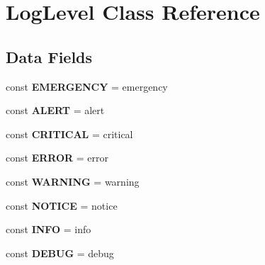 \hypertarget{class_zest_1_1_common_1_1_logger_1_1_log_level}{}\section{Log\+Level Class Reference}
\label{class_zest_1_1_common_1_1_logger_1_1_log_level}
\subsection*{Data Fields}
\begin{DoxyCompactItemize}
\item 
\mbox{\label{class_zest_1_1_common_1_1_logger_1_1_log_level_ad93131122361f85c70dab2636fe863a5}} 
const {\bfseries E\+M\+E\+R\+G\+E\+N\+CY} = \textquotesingle{}emergency\textquotesingle{}
\item 
\mbox{\label{class_zest_1_1_common_1_1_logger_1_1_log_level_a037a7f6e892e6adb07c2aa099fbaf69d}} 
const {\bfseries A\+L\+E\+RT} = \textquotesingle{}alert\textquotesingle{}
\item 
\mbox{\label{class_zest_1_1_common_1_1_logger_1_1_log_level_a5e924d1434e5b36fdc72dd03b1a8f744}} 
const {\bfseries C\+R\+I\+T\+I\+C\+AL} = \textquotesingle{}critical\textquotesingle{}
\item 
\mbox{\label{class_zest_1_1_common_1_1_logger_1_1_log_level_a7f79d7b73cfb40bb7855d4260393cc0f}} 
const {\bfseries E\+R\+R\+OR} = \textquotesingle{}error\textquotesingle{}
\item 
\mbox{\label{class_zest_1_1_common_1_1_logger_1_1_log_level_ad0c7ccd2f8b92a760391d21d0ec7b339}} 
const {\bfseries W\+A\+R\+N\+I\+NG} = \textquotesingle{}warning\textquotesingle{}
\item 
\mbox{\label{class_zest_1_1_common_1_1_logger_1_1_log_level_a0b32ca69140ca26e6614dddf004ae3d9}} 
const {\bfseries N\+O\+T\+I\+CE} = \textquotesingle{}notice\textquotesingle{}
\item 
\mbox{\label{class_zest_1_1_common_1_1_logger_1_1_log_level_af2d1bd27ecbe33ecaadb558404e9c669}} 
const {\bfseries I\+N\+FO} = \textquotesingle{}info\textquotesingle{}
\item 
\mbox{\label{class_zest_1_1_common_1_1_logger_1_1_log_level_a758c150b67e476ecf77478f16b387c61}} 
const {\bfseries D\+E\+B\+UG} = \textquotesingle{}debug\textquotesingle{}
\end{DoxyCompactItemize}


